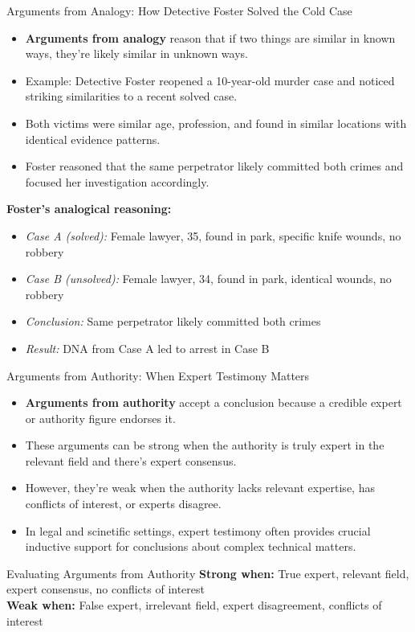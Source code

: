 \documentclass{beamer}
\begin{document}
\begin{frame}{Arguments from Analogy: How Detective Foster Solved the Cold Case}
	\begin{itemize}
		\item \textbf{Arguments from analogy} reason that if two things are similar in known ways, they're likely similar in unknown ways.
		\item Example: Detective Foster reopened a 10-year-old murder case and noticed striking similarities to a recent solved case.
		\item Both victims were similar age, profession, and found in similar locations with identical evidence patterns.
		\item Foster reasoned that the same perpetrator likely committed both crimes and focused her investigation accordingly.
	\end{itemize}
	
	\begin{example}
		\scriptsize
		\textbf{Foster's analogical reasoning:}
		\begin{itemize}
			\item \textit{Case A (solved):} Female lawyer, 35, found in park, specific knife wounds, no robbery
			\item \textit{Case B (unsolved):} Female lawyer, 34, found in park, identical wounds, no robbery
			\item \textit{Conclusion:} Same perpetrator likely committed both crimes
			\item \textit{Result:} DNA from Case A led to arrest in Case B
		\end{itemize}
	\end{example}
\end{frame}

\begin{frame}{Arguments from Authority: When Expert Testimony Matters}
	\begin{itemize}
		\item \textbf{Arguments from authority} accept a conclusion because a credible expert or authority figure endorses it.
		\item These arguments can be strong when the authority is truly expert in the relevant field and there's expert consensus.
		\item However, they're weak when the authority lacks relevant expertise, has conflicts of interest, or experts disagree.
		\item In legal and scinetific settings, expert testimony often provides crucial inductive support for conclusions about complex technical matters.
	\end{itemize}
	
	\begin{block}{Evaluating Arguments from Authority}
		\textbf{Strong when:} True expert, relevant field, expert consensus, no conflicts of interest
		\\[0.5em]
		\textbf{Weak when:} False expert, irrelevant field, expert disagreement, conflicts of interest
	\end{block}
\end{frame}
\end{document}
